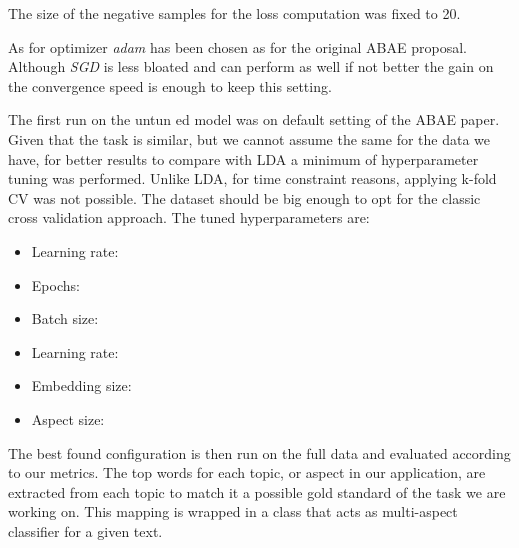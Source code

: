 The size of the negative samples for the loss computation was fixed to 20.

As for optimizer \textit{adam} has been chosen as for the original ABAE proposal.
Although \textit{SGD} is less bloated and can perform as well if not better \cite{wilson2018marginal} the gain on the
convergence speed is enough to keep this setting.

The first run on the untun                                 ed model was on default setting of the ABAE paper.
Given that the task is similar, but we cannot assume the same for the data we have, for better results
to compare with LDA a minimum of hyperparameter tuning was performed.
Unlike LDA, for time constraint reasons,  applying k-fold CV was not possible.
The dataset should be big enough to opt for the classic cross validation approach.
The tuned hyperparameters are:
\begin{itemize}
    \item {Learning rate:}
    \item {Epochs:}
    \item {Batch size:}
    \item {Learning rate:}
    \item {Embedding size:}
    \item {Aspect size:}
\end{itemize}

The best found configuration is then run on the full data and evaluated according to our metrics.
The top words for each topic, or aspect in our application, are extracted from each topic to match it a possible gold standard of the task we are working on.
This mapping is wrapped in a class that acts as multi-aspect classifier for a given text.